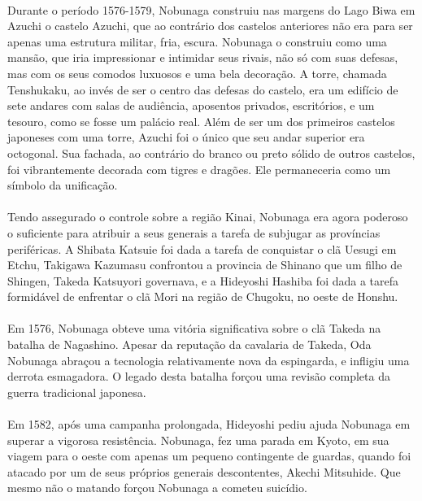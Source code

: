 \documentclass[12pt, a4paper]{article}
\begin{document}
            \\
            \indent Durante o período 1576-1579, Nobunaga construiu nas margens do Lago Biwa em Azuchi o castelo Azuchi, que ao contrário dos castelos anteriores não era para ser apenas uma estrutura militar, fria, escura. Nobunaga o construiu como uma mansão, que iria impressionar e intimidar seus rivais, não só com suas defesas, mas com os seus comodos luxuosos e uma bela decoração. A torre, chamada Tenshukaku, ao invés de ser o centro das defesas do castelo, era um edifício de sete andares com salas de audiência, aposentos privados, escritórios, e um tesouro, como se fosse um palácio real. Além de ser um dos primeiros castelos japoneses com uma torre, Azuchi foi o único que seu andar superior era octogonal. Sua fachada, ao contrário do branco ou preto sólido de outros castelos, foi vibrantemente decorada com tigres e dragões. Ele permaneceria como um símbolo da unificação.\\
            \\
            \indent Tendo assegurado o controle sobre a região Kinai, Nobunaga era agora poderoso o suficiente para atribuir a seus generais a tarefa de subjugar as províncias periféricas. A Shibata Katsuie foi dada a tarefa de conquistar o clã Uesugi em Etchu, Takigawa Kazumasu confrontou a provincia de  Shinano que um filho de Shingen, Takeda Katsuyori governava, e a Hideyoshi Hashiba foi dada a tarefa formidável de enfrentar o clã Mori na região de Chugoku, no oeste de Honshu.\\
            \\
            \indent Em 1576, Nobunaga obteve uma vitória significativa sobre o clã Takeda na batalha de Nagashino. Apesar da reputação da cavalaria de Takeda, Oda Nobunaga abraçou a tecnologia relativamente nova da espingarda, e infligiu uma derrota esmagadora. O legado desta batalha forçou uma revisão completa da guerra tradicional japonesa.\\
            \\
            \indent Em 1582, após uma campanha prolongada, Hideyoshi pediu ajuda Nobunaga em superar a vigorosa resistência. Nobunaga, fez uma parada em Kyoto, em sua viagem para o oeste com apenas um pequeno contingente de guardas, quando foi atacado por um de seus próprios generais descontentes, Akechi Mitsuhide. Que mesmo não o matando forçou Nobunaga a cometeu suicídio.\\
            
\end{document}
